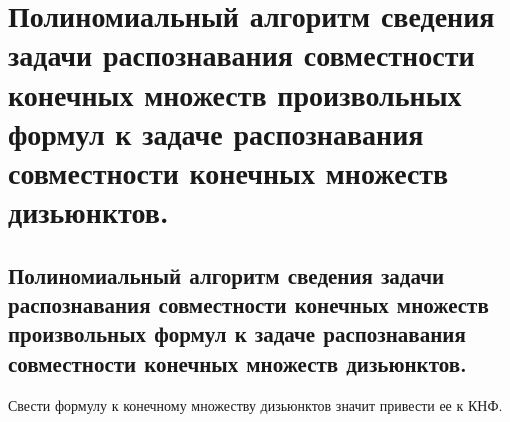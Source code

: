 \section{Полиномиальный алгоритм сведения задачи распознавания совместности конечных множеств произвольных формул к задаче распознавания совместности конечных множеств дизьюнктов.}

\subsection{Полиномиальный алгоритм сведения задачи распознавания совместности конечных множеств произвольных формул к задаче распознавания совместности конечных множеств дизьюнктов.}

Свести формулу к конечному множеству дизьюнктов значит привести ее к КНФ.